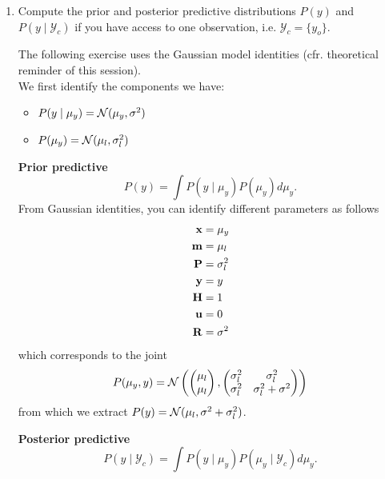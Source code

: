 \documentclass[11pt, a4paper]{article}
\begin{document}
\begin{enumerate}
    \item Compute the prior and posterior predictive distributions $P(y)$ and $P(y\mid \mathcal{Y}_c)$ if you have access to one observation, i.e. $\mathcal{Y}_c = \{y_o\}$.
    
    \begin{solution}
        The following exercise uses the Gaussian model identities (cfr. theoretical reminder of this session).\\

        We first identify the components we have:
        \begin{itemize}
            \item $P(y\mid \mu_y) = \mathcal{N}(\mu_y,\text{$\sigma^2$})$
            \item $P(\mu_y) = \mathcal{N}(\mu_l,\sigma_l^2)$
        \end{itemize}
        \textbf{Prior predictive}\\
        $$P(y) = \int P(y\mid \mu_y) P(\mu_y) d\mu_y.$$
        From Gaussian identities, you can identify different parameters as follows
        \begin{align*}
            \mathbf{x} &= \mu_y\\
            \mathbf{m} &= \mu_l\\
            \mathbf{P} &= \sigma_l^2\\
            \mathbf{y} &= y\\
            \mathbf{H} &= 1\\
            \mathbf{u} &= 0\\
            \mathbf{R} &= \text{$\sigma^2$}
      \end{align*}
      which corresponds to the joint
      $$
      P(\mu_y, y) = \mathcal{N}
      \begin{pmatrix}
        \begin{pmatrix}
            \mu_l\\
            \mu_l\\
        \end{pmatrix},
        \begin{pmatrix}
            \sigma_l^2 & \sigma_l^2\\
            \sigma_l^2 & \sigma_l^2 + \text{$\sigma^2$}\\
        \end{pmatrix}
    \end{pmatrix}
      $$
      from which we extract $P(y) = \mathcal{N}(\mu_l, \text{$\sigma^2$} + \sigma_l^2)$.

      \textbf{Posterior predictive}\\
      $$P(y\mid \mathcal{Y}_c) = \int P(y\mid \mu_y) P(\mu_y \mid \mathcal{Y}_c) d\mu_y.$$
      

\end{solution}
\end{enumerate}
\end{document}
